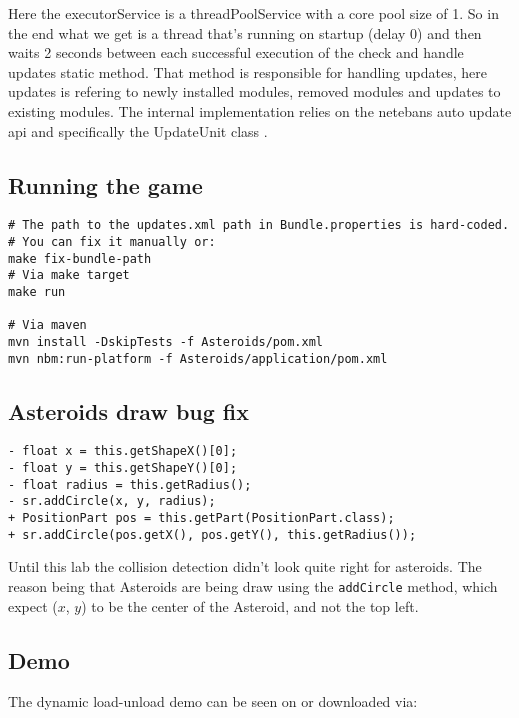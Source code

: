 Here the executorService is a threadPoolService with a core pool size of 1.
So in the end what we get is a thread that's running on startup (delay 0) and
then waits 2 seconds between each successful execution of the check and handle
updates static method.
That method is responsible for handling updates, here updates is refering to
newly installed modules, removed modules and updates to existing modules. The
internal implementation relies on the netebans auto update api and specifically
the UpdateUnit class \cite{netbeans-update-unit}.

\subsection{Running the game}
\begin{verbatim}
# The path to the updates.xml path in Bundle.properties is hard-coded.
# You can fix it manually or:
make fix-bundle-path
# Via make target
make run

# Via maven
mvn install -DskipTests -f Asteroids/pom.xml
mvn nbm:run-platform -f Asteroids/application/pom.xml
\end{verbatim}

\subsection{Asteroids draw bug fix}
\begin{verbatim}
- float x = this.getShapeX()[0];
- float y = this.getShapeY()[0];
- float radius = this.getRadius();
- sr.addCircle(x, y, radius);
+ PositionPart pos = this.getPart(PositionPart.class);
+ sr.addCircle(pos.getX(), pos.getY(), this.getRadius());
\end{verbatim}
Until this lab the collision detection didn't look quite right for asteroids.
The reason being that Asteroids are being draw using the \texttt{addCircle}
method, which expect ($x$, $y$) to be the center of the Asteroid, and not the top left.

\subsection{Demo}
The dynamic load-unload demo can be seen on
 or downloaded via:

